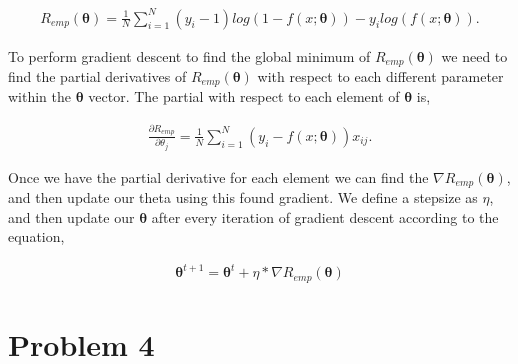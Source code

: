 \documentclass[paper=a4, fontsize=11pt]{scrartcl} %
\numberwithin{equation}{section} %
\numberwithin{figure}{section} %
\numberwithin{table}{section} %
\begin{document}
\begin{align}
R_{emp}(\bm{\theta}) = \frac{1}{N}\sum\limits_{i=1}^N(y_{i}-1)log(1-f(x;\bm{\theta})) - y_{i}log(f(x;\bm{\theta})).
\end{align}

To perform gradient descent to find the global minimum of $R_{emp}(\bm{\theta})$ we need to find the partial derivatives of $R_{emp}(\bm{\theta})$ with respect to each different parameter within the $\bm{\theta}$ vector.  The partial with respect to each element of $\bm{\theta}$ is,

\begin{align}
\frac{\partial R_{emp}}{\partial \theta_{j}} = \frac{1}{N}\sum\limits_{i=1}^N(y_{i}-f(x;\bm{\theta}))x_{ij}.
\end{align}

Once we have the partial derivative for each element we can find the $\nabla R_{emp}(\bm{\theta})$, and then update our theta using this found gradient. 
We define a stepsize as $\eta$, and then update our $\bm{\theta}$ after every iteration of gradient descent according to the equation,

\begin{align}
\bm{\theta} ^{t+1} = \bm{\theta} ^t + \eta*\nabla R_{emp}(\bm{\theta})
\end{align}



\section{Problem 4}
\end{document}
